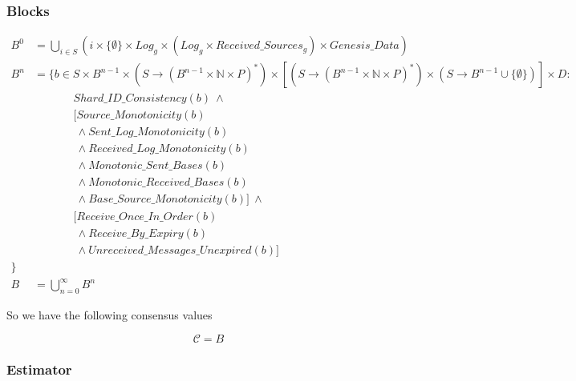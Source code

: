 \subsubsection{Blocks}
\begin{defn}
\begin{align*}
  B^0&= \bigcup_{i \in S} (i \times \{ \emptyset \} \times Log_g \times ( Log_g \times Received\_Sources_g ) \times Genesis\_Data) \\
  B^n&= \Big\{ b \in S \times B^{n-1} \times (S \to (B^{n-1} \times \mathbb{N} \times P)^*) \times [(S \to (B^{n-1} \times \mathbb{N} \times P)^*) \times (S \to B^{n-1} \cup \{\emptyset\})] \times D :
  \\
  &~~~~~~~~~~~~~~~~ Shard\_ID\_Consistency(b) ~\land \\
  &~~~~~~~~~~~~~~~~\big[Source\_Monotonicity(b) \\
  &~~~~~~~~~~~~~~~~~ \land Sent\_Log\_Monotonicity(b) \\
  &~~~~~~~~~~~~~~~~~ \land Received\_Log\_Monotonicity(b) \\
  &~~~~~~~~~~~~~~~~~ \land Monotonic\_Sent\_Bases(b) \\
  &~~~~~~~~~~~~~~~~~ \land Monotonic\_Received\_Bases(b)\\
  &~~~~~~~~~~~~~~~~~ \land Base\_Source\_Monotonicity(b) \big] ~\land \\
  &~~~~~~~~~~~~~~~~\big[Receive\_Once\_In\_Order(b) \\
  &~~~~~~~~~~~~~~~~~ \land Receive\_By\_Expiry(b) \\
  &~~~~~~~~~~~~~~~~~ \land Unreceived\_Messages\_Unexpired(b) \big] \\
  \Big\} \\
  B &= \bigcup_{n=0}^\infty B^n
\end{align*}
\end{defn}


So we have the following consensus values
\begin{defn}
$$
\mathcal{C} = B
$$
\end{defn}

\subsubsection{Estimator}

\iffalse
Let us assume for now that we have an assignment of parent shards for each shard in $S$. Only the root shard has its parent as $\emptyset$.
\begin{defn}[Parent]
\begin{align*}
  Parent&: S \to S \cup \{ \emptyset \}
\end{align*}
\end{defn}
\fi

